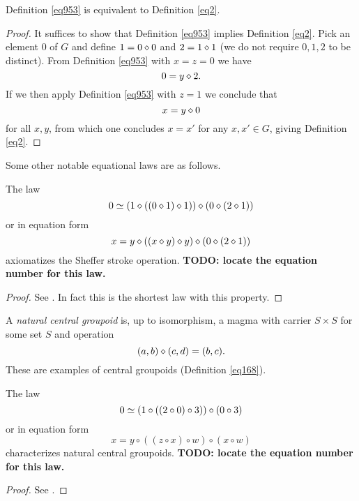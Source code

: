 \begin{theorem}[953 is equivalent to 2]\label{953_equiv_2}\leanok  Definition \ref{eq953} is equivalent to Definition \ref{eq2}.
\end{theorem}

\begin{proof}\leanok  It suffices to show that Definition \ref{eq953} implies Definition \ref{eq2}.  Pick an element $0$ of $G$ and define $1 = 0 \diamond 0$ and $2 = 1 \diamond 1$ (we do not require $0,1,2$ to be distinct).
From Definition \ref{eq953} with $x=z=0$ we have
$$ 0 = y \diamond 2.$$
If we then apply Definition \ref{eq953} with $z=1$ we conclude that
$$ x = y \diamond 0$$
for all $x,y$, from which one concludes $x=x'$ for any $x,x' \in G$, giving Definition \ref{eq2}.
\end{proof}


Some other notable equational laws are as follows.

\begin{theorem}\label{sheffer}  The law
$$ 0 \simeq (1 \diamond ((0 \diamond 1) \diamond 1)) \diamond (0 \diamond (2 \diamond 1))$$
or in equation form
$$ x = y \diamond ((x \diamond y) \diamond y) \diamond (0 \diamond (2 \diamond 1)) $$
axiomatizes the Sheffer stroke operation. {\bf TODO: locate the equation number for this law.}
\end{theorem}

\begin{proof}
See \cite{mccune_et_al}.  In fact this is the shortest law with this property.
\end{proof}

A \emph{natural central groupoid} is, up to isomorphism, a magma with carrier $S \times S$ for some set $S$ and operation
$$ (a,b) \diamond (c,d) = (b,c).$$
These are examples of central groupoids (Definition \ref{eq168}).

\begin{theorem}\label{natural-central-groupoid}  The law
$$ 0 \simeq (1 \circ ((2 \circ 0) \circ 3)) \circ (0 \circ 3)$$
or in equation form
$$ x = y \circ ((z \circ x) \circ w) \circ (x \circ w)$$
characterizes natural central groupoids. {\bf TODO: locate the equation number for this law.}
\end{theorem}

\begin{proof}
  See \cite[Theorem 5]{knuth}.
\end{proof}
